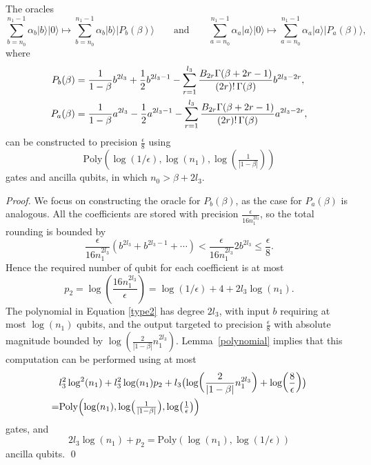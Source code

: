\documentclass[aps,pra,twocolumn,superscriptaddress,preprintnumbers,amsmath,amssymb]{revtex4-2}
\begin{document}
 \begin{proposition}\label{prop:summation}
     The oracles
    \begin{equation}
       \sum_{b=n_0}^{n_1-1}\alpha_b |b\rangle|0\rangle\mapsto \sum_{b=n_0}^{n_1-1}\alpha_b|b\rangle |P_b(\beta)\rangle \qquad\mathrm{and} \qquad \sum_{a=n_0}^{n_1-1}\alpha_a|a\rangle|0\rangle\mapsto \sum_{a=n_0}^{n_1-1}\alpha_a|a\rangle |P_a(\beta)\rangle,
    \end{equation}
where
\begin{align}\label{type2}
P_b(\beta)&=\frac{1}{1-\beta}b^{2l_3}+\frac{1}{2}b^{2l_3-1}
  -\sum_{r=1}^{l_3} \frac{B_{2r}\Gamma(\beta+2r-1)}{(2r)!\,\Gamma(\beta)} b^{2l_3-2r},\notag\\
P_a(\beta)&=\frac{1}{1-\beta}a^{2l_3}-\frac{1}{2}a^{2l_3-1}
  -\sum_{r=1}^{l_3} \frac{B_{2r}\Gamma(\beta+2r-1)}{(2r)!\,\Gamma(\beta)} a^{2l_3-2r},
\end{align}
can be constructed to precision $\frac{\epsilon}{8}$ using
\begin{equation}
    \mathrm{Poly}(\log(1/\epsilon),\log(n_1),\log(\tfrac{1}{|1-\beta|}))
\end{equation}
gates and ancilla qubits, in which $n_0>\beta+2l_3$.
 \end{proposition}
\noindent\textit{Proof.} We focus on constructing the oracle for $P_b(\beta)$, as the case for $P_a(\beta)$ is analogous. All the coefficients are stored with precision $\frac{\epsilon}{16n_1^{2l_3}}$, so the total rounding  is bounded by
\begin{equation}
    \frac{\epsilon}{16n_1^{2l_3}}(b^{2l_3}+b^{2l_3-1}+\cdots)<\frac{\epsilon}{16n_1^{2l_3}}2b^{2l_3}\leq\frac{\epsilon}{8}.
\end{equation}
Hence the required number of qubit for each coefficient is at most 
\begin{equation}
    p_2=\log(\frac{16n_1^{2l_3}}{\epsilon})=\log(1/\epsilon)+4+2l_3\log(n_1).
\end{equation}
The polynomial in Equation \eqref{type2} has degree $2l_3$, with input $b$ requiring at most $\log(n_1)$ qubits, and the output targeted to precision $\frac{\epsilon}{8}$ with absolute magnitude bounded by $\log(\frac{2}{|1-\beta|}n_1^{2l_3})$. Lemma~\ref{polynomial} implies that this computation can be performed using at most
\begin{align}
    &l_3^2\log^2(n_1)+l_3^2\log(n_1)p_2+l_3\bigl(\log(\frac{2}{|1-\beta|}n_1^{2l_3})+\log(\frac{8}{\epsilon})\bigr)\notag\\
    =&\mathrm{Poly}\Bigl(\log(n_1),\log(\tfrac{1}{|1-\beta|}),\log(\tfrac{1}{\epsilon})\Bigr)
\end{align}
gates, and 
\begin{equation}
    2l_3\log(n_1)+p_2=\mathrm{Poly}(\log(n_1),\log(1/\epsilon))
\end{equation}
ancilla qubits. \qed
\end{document}
